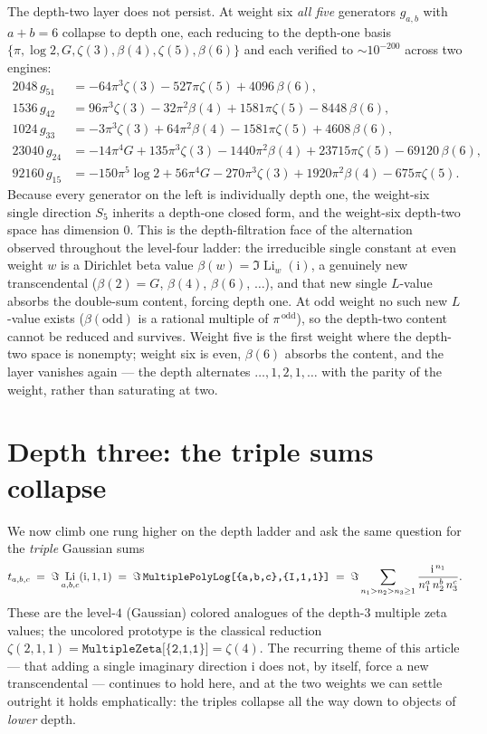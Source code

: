 \documentclass[11pt]{article}
\DeclareMathOperator{\Li}{Li}
\newcommand{\iu}{\mathrm{i}}
\theoremstyle{plain}
\theoremstyle{remark}
\begin{document}
The depth-two layer does not persist. At weight six \emph{all five} generators $g_{a,b}$ with $a+b=6$ collapse to depth one, each reducing to the depth-one basis $\{\pi,\log 2,G,\zeta(3),\beta(4),\zeta(5),\beta(6)\}$ and each verified to $\sim 10^{-200}$ across two engines:
\begin{align}
  \label{eq:g51}
  2048\,g_{51} &= -64\pi^3\zeta(3)-527\pi\zeta(5)+4096\,\beta(6),\\
  \label{eq:g42}
  1536\,g_{42} &= 96\pi^3\zeta(3)-32\pi^2\beta(4)+1581\pi\zeta(5)-8448\,\beta(6),\\
  \label{eq:g33}
  1024\,g_{33} &= -3\pi^3\zeta(3)+64\pi^2\beta(4)-1581\pi\zeta(5)+4608\,\beta(6),\\
  \label{eq:g24}
  23040\,g_{24} &= -14\pi^4 G+135\pi^3\zeta(3)-1440\pi^2\beta(4)+23715\pi\zeta(5)-69120\,\beta(6),\\
  \label{eq:g15}
  92160\,g_{15} &= -150\pi^5\log 2+56\pi^4 G-270\pi^3\zeta(3)+1920\pi^2\beta(4)-675\pi\zeta(5).
\end{align}
Because every generator on the left is individually depth one, the weight-six single direction $S_5$ inherits a depth-one closed form, and the weight-six depth-two space has dimension $0$. This is the depth-filtration face of the alternation observed throughout the level-four ladder: the irreducible single constant at even weight $w$ is a Dirichlet beta value $\beta(w)=\Im\Li_w(\iu)$, a genuinely new transcendental ($\beta(2)=G$, $\beta(4)$, $\beta(6)$, $\dots$), and that new single $L$-value absorbs the double-sum content, forcing depth one. At odd weight no such new $L$-value exists ($\beta(\mathrm{odd})$ is a rational multiple of $\pi^{\,\mathrm{odd}}$), so the depth-two content cannot be reduced and survives. Weight five is the first weight where the depth-two space is nonempty; weight six is even, $\beta(6)$ absorbs the content, and the layer vanishes again --- the depth alternates $\dots,1,2,1,\dots$ with the parity of the weight, rather than saturating at two.


\section{Depth three: the triple sums collapse}

We now climb one rung higher on the depth ladder and ask the same question for the \emph{triple} Gaussian sums
\[
  t_{a,b,c} \;=\; \Im\Li_{a,b,c}(\iu,1,1)\;=\;\Im\,\texttt{MultiplePolyLog[\{a,b,c\},\allowbreak\{I,1,1\}]}
  \;=\;\Im\sum_{n_1>n_2>n_3\ge 1}\frac{\iu^{\,n_1}}{n_1^{a}\,n_2^{b}\,n_3^{c}}.
\]
These are the level-$4$ (Gaussian) colored analogues of the depth-$3$ multiple zeta values; the uncolored prototype is the classical reduction $\zeta(2,1,1)=\texttt{MultipleZeta[\{2,1,1\}]}=\zeta(4)$. The recurring theme of this article --- that adding a single imaginary direction $\iu$ does not, by itself, force a new transcendental --- continues to hold here, and at the two weights we can settle outright it holds emphatically: the triples collapse all the way down to objects of \emph{lower} depth.
\end{document}
